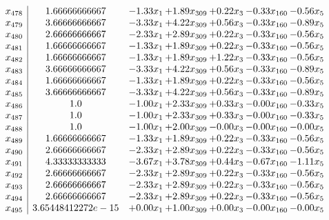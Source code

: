 \documentclass[8pt]{article}
\begin{document}
\[\begin{array}{c| c c@{\hskip 2pt} c@{\hskip 2pt} c@{\hskip 2pt} c@{\hskip 2pt} c@{\hskip 2pt} }
 x_{478}   &  1.66666666667 & -1.33 x_{1} & +  1.89 x_{309} & +  0.22 x_{3} & -0.33 x_{160} & -0.56 x_{5}\\
 x_{479}   &  3.66666666667 & -3.33 x_{1} & +  4.22 x_{309} & +  0.56 x_{3} & -0.33 x_{160} & -0.89 x_{5}\\
 x_{480}   &  2.66666666667 & -2.33 x_{1} & +  2.89 x_{309} & +  0.22 x_{3} & -0.33 x_{160} & -0.56 x_{5}\\
 x_{481}   &  1.66666666667 & -1.33 x_{1} & +  1.89 x_{309} & +  0.22 x_{3} & -0.33 x_{160} & -0.56 x_{5}\\
 x_{482}   &  1.66666666667 & -1.33 x_{1} & +  1.89 x_{309} & +  1.22 x_{3} & -0.33 x_{160} & -0.56 x_{5}\\
 x_{483}   &  3.66666666667 & -3.33 x_{1} & +  4.22 x_{309} & +  0.56 x_{3} & -0.33 x_{160} & -0.89 x_{5}\\
 x_{484}   &  1.66666666667 & -1.33 x_{1} & +  1.89 x_{309} & +  0.22 x_{3} & -0.33 x_{160} & -0.56 x_{5}\\
 x_{485}   &  3.66666666667 & -3.33 x_{1} & +  4.22 x_{309} & +  0.56 x_{3} & -0.33 x_{160} & -0.89 x_{5}\\
 x_{486}   &  1.0 & -1.00 x_{1} & +  2.33 x_{309} & +  0.33 x_{3} & -0.00 x_{160} & -0.33 x_{5}\\
 x_{487}   &  1.0 & -1.00 x_{1} & +  2.33 x_{309} & +  0.33 x_{3} & -0.00 x_{160} & -0.33 x_{5}\\
 x_{488}   &  1.0 & -1.00 x_{1} & +  2.00 x_{309} & -0.00 x_{3} & -0.00 x_{160} & -0.00 x_{5}\\
 x_{489}   &  1.66666666667 & -1.33 x_{1} & +  1.89 x_{309} & +  0.22 x_{3} & -0.33 x_{160} & -0.56 x_{5}\\
 x_{490}   &  2.66666666667 & -2.33 x_{1} & +  2.89 x_{309} & +  0.22 x_{3} & -0.33 x_{160} & -0.56 x_{5}\\
 x_{491}   &  4.33333333333 & -3.67 x_{1} & +  3.78 x_{309} & +  0.44 x_{3} & -0.67 x_{160} & -1.11 x_{5}\\
 x_{492}   &  2.66666666667 & -2.33 x_{1} & +  2.89 x_{309} & +  0.22 x_{3} & -0.33 x_{160} & -0.56 x_{5}\\
 x_{493}   &  2.66666666667 & -2.33 x_{1} & +  2.89 x_{309} & +  0.22 x_{3} & -0.33 x_{160} & -0.56 x_{5}\\
 x_{494}   &  2.66666666667 & -2.33 x_{1} & +  2.89 x_{309} & +  0.22 x_{3} & -0.33 x_{160} & -0.56 x_{5}\\
 x_{495}   &  3.65448412272e-15 & +  0.00 x_{1} & +  1.00 x_{309} & +  0.00 x_{3} & -0.00 x_{160} & -0.00 x_{5}\\

\end{array}\]
\end{document}
